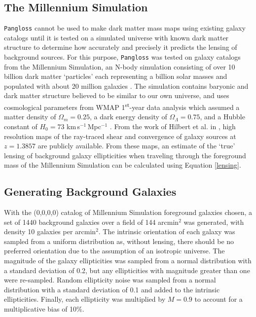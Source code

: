 \documentclass[%
 reprint,
 amsmath,amssymb,
 aps,nofootinbib
]{revtex4-1}
\begin{document}
\subsection{The Millennium Simulation} \label{ms}
\texttt{Pangloss} cannot be used to make dark matter mass maps using existing galaxy catalogs until it is tested on a simulated universe with known dark matter structure to determine how accurately and precisely it predicts the lensing of background sources. For this purpose, \texttt{Pangloss} was tested on galaxy catalogs from the Millennium Simulation, an N-body simulation consisting of over 10 billion dark matter `particles' each representing a billion solar masses and populated with about 20 million galaxies \cite{millennium_simulation}. The simulation contains baryonic and dark matter structure believed to be similar to our own universe, and uses cosmological parameters from WMAP 1\textsuperscript{st}-year data analysis which assumed a matter density of $\Omega_m=0.25$, a dark energy density of $\Omega_\Lambda=0.75$, and a Hubble constant of $H_0=73$ km$\,$s$^{-1}\,$Mpc$^{-1}$ \cite{wmap1}. From the work of Hilbert et al. in \cite{ray_tracing}, high resolution maps of the ray-traced shear and convergence of galaxy sources at $z=1.3857$ are publicly available. From these maps, an estimate of the `true' lensing of background galaxy ellipticities when traveling through the foreground mass of the Millennium Simulation can be calculated using Equation \eqref{lensing}.


\subsection{Generating Background Galaxies}
With the (0,0,0,0) catalog of Millennium Simulation foreground galaxies chosen, a set of 1440 background galaxies over a field of 144 arcmin$^2$ was generated, with density 10 galaxies per arcmin$^2$. The intrinsic orientation of each galaxy was sampled from a uniform distribution as, without lensing, there should be no preferred orientation due to the assumption of an isotropic universe. The magnitude of the galaxy ellipticities was sampled from a normal distribution with a standard deviation of 0.2, but any ellipticities with magnitude greater than one were re-sampled. Random ellipticity noise was sampled from a normal distribution with a standard deviation of 0.1 and added to the intrinsic ellipticities. Finally, each ellipticity was multiplied by $M=0.9$ to account for a multiplicative bias of 10\%.
\end{document}
